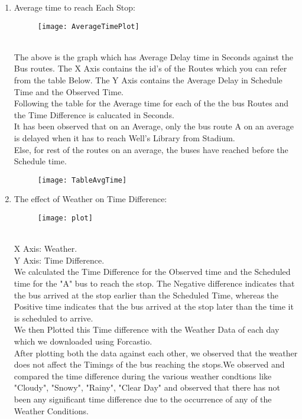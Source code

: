 \documentclass[12pt]{article}
\begin{document}
\begin{enumerate}
	\item Average time to reach Each Stop:
	\begin{figure}[ht!]
			\centering
		\texttt{[image: AverageTimePlot]}
	\end{figure}
		\\The above is the graph which has Average Delay time in Seconds against the Bus routes.
		The X Axis contains the id's of the Routes which you can refer from the table Below.
		The Y Axis contains the Average Delay in Schedule Time and the Observed Time.
	\\Following the table for the Average time for each of the the bus Routes and the Time Difference is calucated in Seconds.
	\\It has been observed that on an Average, only the bus route A on an average is delayed when it has to reach Well's Library from Stadium. \\
	Else, for rest of the routes on an average, the buses have reached before the Schedule time.
	\begin{figure}[ht!]
		\centering
		\texttt{[image: TableAvgTime]}
	\end{figure}
	
	
	
\break	
	\item The effect of Weather on Time Difference:
	
	\begin{figure}[ht!]
	\texttt{[image: plot]}
\end{figure}
\\X Axis: Weather.
\\Y Axis: Time Difference.
\\ We calculated the Time Difference for the Observed time and the Scheduled time for the "A" bus to reach the stop. The Negative difference indicates that the bus arrived at the stop earlier than the Scheduled Time, whereas the Positive time indicates that the bus arrived at the stop later than the time it is scheduled to arrive.
\\We then Plotted this Time difference with the Weather Data of each day which we downloaded using Forcastio.
\\After plotting both the data against each other, we observed that the weather does not affect the Timings of the bus reaching the stops.We observed and compared the time difference during the various weather condtions like "Cloudy", "Snowy", "Rainy", "Clear Day" and observed that there has not been any significant time difference due to the occurrence of any of the Weather Conditions.

\end{enumerate}
\end{document}
